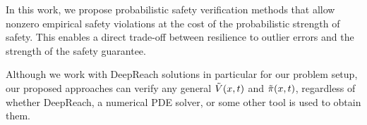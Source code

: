 In this work, we propose probabilistic safety verification methods that allow nonzero empirical safety violations at the cost of the probabilistic strength of safety.
This enables a direct trade-off between resilience to outlier errors and the strength of the safety guarantee.
\vspace{-0.25em}
\begin{remark}
    Although we work with DeepReach solutions in particular for our problem setup, our proposed approaches can verify any general $\Tilde{V}(x,t)$ and $\Tilde{\pi}(x,t)$, regardless of whether DeepReach, a numerical PDE solver, or some other tool is used to obtain them.
\end{remark}
\vspace{-1.5em}
